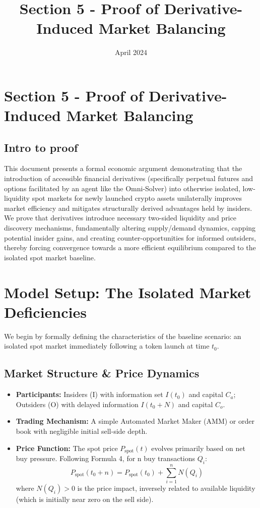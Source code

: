\documentclass{article}
\title{Section 5 - Proof of Derivative-Induced Market Balancing}
\date{April 2024}
\begin{document}
\section{Section 5 - Proof of Derivative-Induced Market Balancing}

\subsection {Intro to proof}

This document presents a formal economic argument demonstrating that the introduction of accessible financial derivatives (specifically perpetual futures and options facilitated by an agent like the Omni-Solver) into otherwise isolated, low-liquidity spot markets for newly launched crypto assets unilaterally improves market efficiency and mitigates structurally derived advantages held by insiders. We prove that derivatives introduce necessary two-sided liquidity and price discovery mechanisms, fundamentally altering supply/demand dynamics, capping potential insider gains, and creating counter-opportunities for informed outsiders, thereby forcing convergence towards a more efficient equilibrium compared to the isolated spot market baseline.

\section{Model Setup: The Isolated Market Deficiencies}

We begin by formally defining the characteristics of the baseline scenario: an isolated spot market immediately following a token launch at time $t_0$.

\subsection{Market Structure & Price Dynamics}
\begin{itemize}
    \item \textbf{Participants:} Insiders (I) with information set $I(t_0)$ and capital $C_a$; Outsiders (O) with delayed information $I(t_0+N)$ and capital $C_o$.
    \item \textbf{Trading Mechanism:} A simple Automated Market Maker (AMM) or order book with negligible initial sell-side depth.
    \item \textbf{Price Function:} The spot price $P_{\text{spot}}(t)$ evolves primarily based on net buy pressure. Following Formula 4, for n buy transactions $Q_i$:
    \[
    P_{\text{spot}}(t_0 + n) = P_{\text{spot}}(t_0) + \sum_{i=1}^{n} N(Q_i)
    \]
    where $N(Q_i) > 0$ is the price impact, inversely related to available liquidity (which is initially near zero on the sell side).
\end{itemize}
\end{document}
